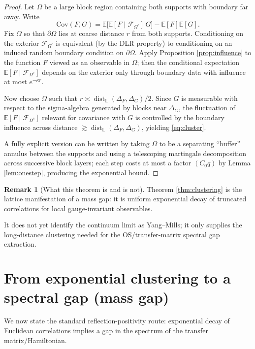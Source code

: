 \documentclass[11pt]{article}
\theoremstyle{definition}
\newtheorem{remark}[theorem]{Remark}
\newcommand{\E}{\mathbb{E}}
\newcommand{\Cov}{\mathrm{Cov}}
\newcommand{\1}{\mathbf{1}}
\newcommand{\dist}{\operatorname{dist}}
\begin{document}
\begin{proof}
Let $\Omega$ be a large block region containing both supports with boundary far away. Write
\[
\Cov(F,G)=\E\big[\E[F\mid\mathcal{F}_{\Omega^c}]\,G\big]-\E[F]\E[G].
\]
Fix $\Omega$ so that $\partial\Omega$ lies at coarse distance $r$ from both supports. Conditioning on the exterior $\mathcal{F}_{\Omega^c}$ is equivalent (by the DLR property) to conditioning on an induced random boundary condition on $\partial\Omega$. Apply Proposition \ref{prop:influence} to the function $F$ viewed as an observable in $\Omega$; then the conditional expectation $\E[F\mid\mathcal{F}_{\Omega^c}]$ depends on the exterior only through boundary data with influence at most $e^{-\kappa r}$.

Now choose $\Omega$ such that $r\asymp \dist_{\mathbb{L}}(\Delta_F,\Delta_G)/2$. Since $G$ is measurable with respect to the sigma-algebra generated by blocks near $\Delta_G$, the fluctuation of $\E[F\mid\mathcal{F}_{\Omega^c}]$ relevant for covariance with $G$ is controlled by the boundary influence across distance $\gtrsim \dist_{\mathbb{L}}(\Delta_F,\Delta_G)$, yielding \eqref{eq:cluster}.

A fully explicit version can be written by taking $\Omega$ to be a separating ``buffer'' annulus between the supports and using a telescoping martingale decomposition across successive block layers; each step costs at most a factor $(C_0 q)$ by Lemma \ref{lem:onestep}, producing the exponential bound.
\end{proof}

\begin{remark}[What this theorem is and is not]
Theorem \ref{thm:clustering} is the lattice manifestation of a mass gap: it is uniform exponential decay of truncated correlations for local gauge-invariant observables.

It does not yet identify the continuum limit as Yang--Mills; it only supplies the long-distance clustering needed for the OS/transfer-matrix spectral gap extraction.
\end{remark}

\section{From exponential clustering to a spectral gap (mass gap)}

We now state the standard reflection-positivity route: exponential decay of Euclidean correlations implies a gap in the spectrum of the transfer matrix/Hamiltonian.
\end{document}
